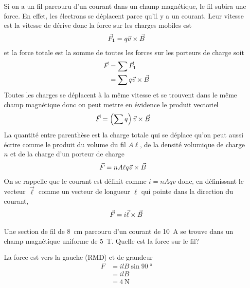 Si on a un fil parcouru d'un courant dans un champ magnétique, le fil subira
une force. En effet, les électrons se déplacent parce qu'il y a un courant.
Leur vitesse est la vitesse de dérive donc la force sur les charges mobiles est
\begin{align*}
  \vec{F}_1 = q\vec{v} \times \vec{B}
\end{align*}
et la force totale est la somme de toutes les forces sur les porteurs de
charge soit
\begin{align*}
  \vec{F} &= \sum \vec{F}_1  \\
      &= \sum q \vec{v} \times \vec{B}
\end{align*}
Toutes les charges se déplacent à la même vitesse et se trouvent dans le même
champ magnétique donc on peut mettre en évidence le produit vectoriel
\begin{align*}
  \vec{F} &= \left( \sum q \right) \vec{v} \times \vec{B}
\end{align*}
La quantité entre parenthèse est la charge totale qui se déplace qu'on peut
aussi écrire comme le produit du volume du fil $A\ell$, de la densité
volumique de charge $n$ et de la charge d'un porteur de charge
\begin{align*}
  \vec{F} &= nA\ell q \vec{v} \times \vec{B}
\end{align*}
On se rappelle que le courant est définit comme $i = nAqv$ donc, en définissant
le vecteur $\vec{\ell}$ comme un vecteur de longueur $\ell$ qui pointe dans la
direction du courant,
\begin{align*}
  \vec{F} = i\vec{\ell} \times \vec{B}
\end{align*}

\begin{diapobox}
  Une section de fil de \SI{8}{\centi\meter} parcouru d'un courant de
  \SI{10}{\ampere} se trouve dans un champ magnétique uniforme de
  \SI{5}{\tesla}. Quelle est la force sur le fil?
\end{diapobox}

\begin{reponsebox}
  La force est vers la gauche (RMD) et de grandeur
  \begin{align*}
    F &= ilB \sin\SI{90}{\degree}  \\
      &= ilB  \\
      &= \SI{4}{\newton}
  \end{align*}
\end{reponsebox}


